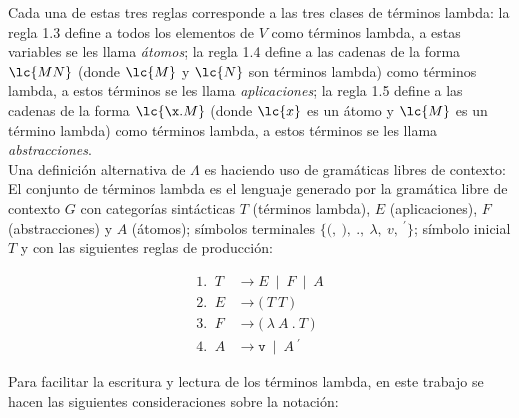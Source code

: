 Cada una de estas tres reglas corresponde a las tres clases de términos lambda:
la regla 1.3 define a todos los elementos de \(V\) como términos lambda, a estas
variables se les llama \emph{átomos}; la regla 1.4 define a las cadenas de
la forma \(\lc{M N}\) (donde \(\lc{M}\) y \(\lc{N}\) son términos lambda) como
términos lambda, a estos términos se les llama \emph{aplicaciones}; la regla 1.5
define a las cadenas de la forma \(\lc{\x.M}\) (donde \(\lc{x}\) es un átomo y
\(\lc{M}\) es un término lambda) como términos lambda, a estos términos se les
llama \emph{abstracciones}. \\

Una definición alternativa de \(\Lambda\) es haciendo uso de gramáticas libres
de contexto: El conjunto de términos lambda es el lenguaje generado por la
gramática libre de contexto \(G\) con categorías sintácticas \(T\) (términos
lambda), \(E\) (aplicaciones), \(F\) (abstracciones) y \(A\) (átomos); símbolos
terminales \(\{\texttt{(},\ \texttt{)},\ \texttt{.},\ \lambda,\ v,\
{}^{\prime}\}\); símbolo inicial \(T\) y con las siguientes reglas de
producción:

\begin{align*}
  \text{1. }\ T &\rightarrow E\ \mid\ F\ \mid\ A\\ 
  \text{2. }\ E &\rightarrow \texttt{(}\ T\ T\ \texttt{)} \\
  \text{3. }\ F &\rightarrow \texttt{(}\ \lambda\ A\ \texttt{.}\ T\ \texttt{)} \\
  \text{4. }\ A &\rightarrow \texttt{v}\ \mid\ A\ {}^{\prime}
\end{align*}

Para facilitar la escritura y lectura de los términos lambda, en este trabajo se
hacen las siguientes consideraciones sobre la notación: \\

